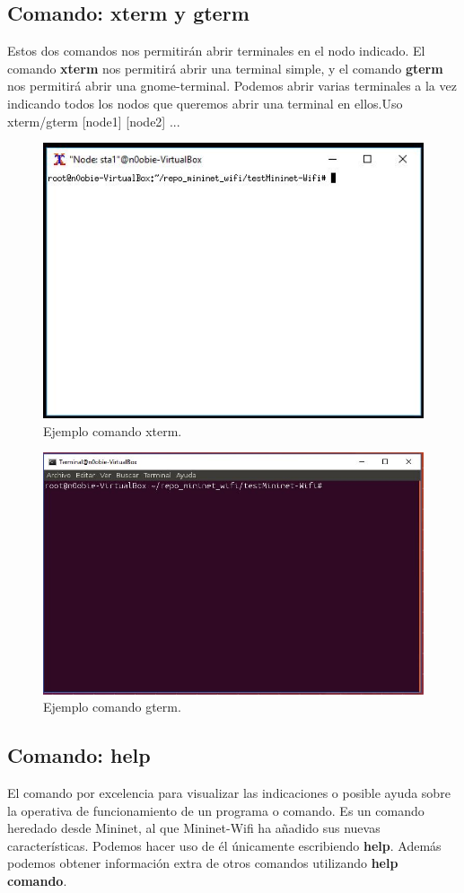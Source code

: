 \subsection{Comando: xterm y gterm}
Estos dos comandos nos permitirán abrir terminales en el nodo indicado. El comando \textbf{xterm} nos permitirá abrir una terminal simple, y el comando \textbf{gterm} nos permitirá abrir una gnome-terminal. Podemos abrir varias terminales a la vez indicando todos los nodos que queremos abrir una terminal en ellos.\newline Uso xterm/gterm [node1] [node2] ... \newline
\newline
 \begin{figure}[!htb]
  \centering
    \includegraphics[width=0.8\linewidth]{./img/cli/3.JPG}
    \caption{Ejemplo comando xterm.}
  \label{fig:yo}
\end{figure}
 \begin{figure}[!htb]
  \centering
    \includegraphics[width=0.7\linewidth]{./img/cli/4.JPG}
    \caption{Ejemplo comando gterm.}
  \label{fig:yo}
\end{figure}
\subsection{Comando: help}
El comando por excelencia para visualizar las indicaciones o posible ayuda sobre la operativa de funcionamiento de un programa o comando. Es un comando heredado desde Mininet, al que Mininet-Wifi ha añadido sus nuevas características. Podemos hacer uso de él únicamente escribiendo \textbf{help}. Además podemos obtener información extra de otros comandos utilizando \textbf{help comando}.
